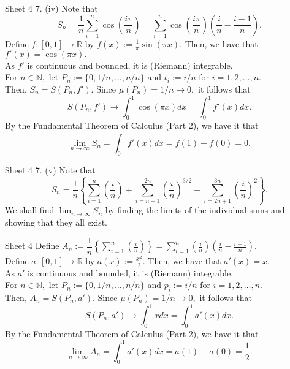 \documentclass[handout, aspectratio=169]{beamer}
\begin{document}
\begin{frame}{Sheet 4}
	7. (iv) Note that \\
	\[S_n = \dfrac{1}{n}\sum_{i=1}^{n}\cos\left(\dfrac{i\pi}{n}\right) = \sum_{i=1}^{n}\cos\left(\dfrac{i\pi}{n}\right)\left(\frac{i}{n} - \frac{i-1}{n}\right) .\]
	Define $f:[0, 1] \to \mathbb{R}$ by $f(x) := \frac{1}{\pi}\sin(\pi x).$ Then, we have that $f'(x) = \cos(\pi x).$\\
	As $f'$ is continuous and bounded, it is (Riemann) integrable. \\
	For $n \in \mathbb{N},$ let $P_n := \{0, 1/n, \ldots, n/n\}$ and $t_i := i/n$ for $i = 1, 2, \ldots, n.$\\
	Then, $S_n = S(P_n, f').$ Since $\mu(P_n) = 1/n \to 0,$ it follows that
	\[S(P_n, f') \to \int_{0}^{1} \cos(\pi x) dx = \int_{0}^{1} f'(x) dx. \]
	By the Fundamental Theorem of Calculus (Part 2), we have it that
	\[\lim_{n\to \infty}S_n = \int_{0}^{1} f'(x) dx = f(1) - f(0) = 0.\]
\end{frame}
\begin{frame}{Sheet 4}
	7. (v) Note that \\
	\[S_n = \dfrac{1}{n}\left\{\sum_{i=1}^{n}\left(\frac{i}{n}\right) + \sum_{i=n+1}^{2n}\left(\frac{i}{n}\right)^{3/2} + \sum_{i=2n+1}^{3n}\left(\frac{i}{n}\right)^2\right\} .\]
	We shall find $\displaystyle\lim_{n\to \infty}S_n$ by finding the limits of the individual sums and showing that they all exist.\\
\end{frame}
	
\begin{frame}{Sheet 4}
	Define $A_n := \displaystyle\dfrac{1}{n}\left\{\sum_{i=1}^{n}\left(\frac{i}{n}\right)\right\} =\sum_{i=1}^{n}\left(\frac{i}{n}\right)\left(\frac{i}{n} - \frac{i-1}{n}\right).$\\
	Define $a:[0, 1] \to \mathbb{R}$ by $a(x) := \frac{x^2}{2}.$ Then, we have that $a'(x) = x.$\\
	As $a'$ is continuous and bounded, it is (Riemann) integrable. \\
	For $n \in \mathbb{N},$ let $P_n := \{0, 1/n, \ldots, n/n\}$ and $p_i := i/n$ for $i = 1, 2, \ldots, n.$\\
	Then, $A_n = S(P_n, a').$ Since $\mu(P_n) = 1/n \to 0,$ it follows that
	\[S(P_n, a') \to \int_{0}^{1} x dx = \int_{0}^{1} a'(x) dx. \]
	By the Fundamental Theorem of Calculus (Part 2), we have it that
	\[\lim_{n\to \infty}A_n = \int_{0}^{1} a'(x) dx = a(1) - a(0) = \dfrac{1}{2}.\]

\end{frame}
\end{document}
